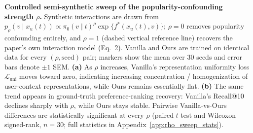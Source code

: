 \caption{\textbf{Controlled semi-synthetic sweep of the popularity-confounding strength $\rho$.} Synthetic interactions are drawn from $p_\rho(v\mid x_u(t)) \propto \pi_0(v\mid t)^{\rho}\exp\{f^*(x_u(t),v)\}$; $\rho{=}0$ removes popularity confounding entirely, and $\rho{=}1$ (dashed vertical reference line) recovers the paper's own interaction model (Eq.~2). Vanilla and Ours are trained on identical data for every $(\rho,\text{seed})$ pair; markers show the mean over 30 seeds and error bars denote $\pm 1$ SEM. \textbf{(a)} As $\rho$ increases, Vanilla's representation uniformity loss $\mathcal{L}_{\mathrm{uni}}$ moves toward zero, indicating increasing concentration / homogenization of user-context representations, while Ours remains essentially flat. \textbf{(b)} The same trend appears in ground-truth preference-ranking recovery: Vanilla's Recall@10 declines sharply with $\rho$, while Ours stays stable. Pairwise Vanilla-vs-Ours differences are statistically significant at every $\rho$ (paired $t$-test and Wilcoxon signed-rank, $n{=}30$; full statistics in Appendix~\ref{app:rho_sweep_stats}).}
